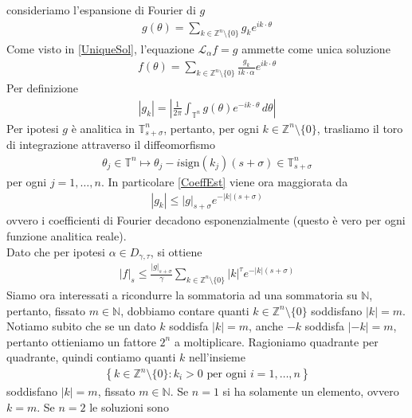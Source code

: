 \documentclass[twoside, 11pt]{amsbook}
\makeatletter
\newcommand{\0}{{(0)}}
\newcommand{\3}{{(3)}}
\theoremstyle{colonplain}
\theoremstyle{colondefinition}
\theoremstyle{colonremark}
\numberwithin{equation}{chapter}
\renewcommand{\proofname}{Dimostrazione}
\renewenvironment{proof}[1][\proofname]{\par
  \pushQED{\qed}%
  \normalfont \topsep6\p@\@plus6\p@\relax
  \trivlist
  \item[\hskip\labelsep\bfseries #1:]\ignorespaces
}{%
  \popQED\endtrivlist\@endpefalse
}
\makeatother
\begin{document}
\begin{proof} consideriamo l'espansione di Fourier di $g$
\begin{align}
    g(\theta) = \sum_{k \in \mathbb{Z}^n\setminus\{0\}} g_k e^{ik \cdot \theta}
\end{align}
Come visto in \eqref{UniqueSol}, l'equazione $\mathcal{L}_\alpha f = g$ ammette come unica soluzione
\begin{align}
    f(\theta) = \sum_{k \in \mathbb{Z}^n\setminus\{0\}} \frac{g_k}{ik \cdot \alpha}e^{ik \cdot \theta}
\end{align}
Per definizione
\begin{align}\label{CoeffEst}
    |g_k| = \left|\frac{1}{2\pi}\int_{\mathbb{T}^n} g(\theta)e^{-ik \cdot \theta} \, d\theta\right|
\end{align}
Per ipotesi $g$ è analitica in $\mathbb{T}^n_{s + \sigma}$, pertanto, per ogni $k \in \mathbb{Z}^n\setminus\{0\}$, trasliamo il toro di integrazione attraverso il diffeomorfismo
\begin{align}
    \theta_j \in \mathbb{T}^n \mapsto \theta_j - i\mathrm{sign}(k_j)(s + \sigma) \in \mathbb{T}^n_{s + \sigma}
\end{align}
per ogni $j = 1, \dots, n$. In particolare \eqref{CoeffEst} viene ora maggiorata da
\begin{align}
    |g_k| \leq |g|_{s + \sigma}e^{-|k|(s + \sigma)}
\end{align}
ovvero i coefficienti di Fourier decadono esponenzialmente (questo è vero per ogni funzione analitica reale). \\
Dato che per ipotesi $\alpha \in D_{\gamma, \tau}$, si ottiene
\begin{align}\label{|f|_s Est}
    |f|_s \leq \frac{|g|_{s + \sigma}}{\gamma}\sum_{k \in \mathbb{Z}^n\setminus\{0\}} |k|^\tau e^{-|k|(s + \sigma)}
\end{align}
Siamo ora interessati a ricondurre la sommatoria ad una sommatoria su $\mathbb{N}$, pertanto, fissato $m \in \mathbb{N}$, dobbiamo contare quanti $k \in \mathbb{Z}^n\setminus\{0\}$ soddisfano $|k| = m$. Notiamo subito che se un dato $k$ soddisfa $|k| = m$, anche $-k$ soddisfa $|-k| = m$, pertanto ottieniamo un fattore $2^n$ a moltiplicare. Ragioniamo quadrante per quadrante, quindi contiamo quanti $k$ nell'insieme
\begin{align}
    \left\{k \in \mathbb{Z}^n\setminus\{0\} : k_i > 0 \text{ per ogni } i = 1, \dots, n\right\}
\end{align}
soddisfano $|k| = m$, fissato $m \in \mathbb{N}$. Se $n = 1$ si ha solamente un elemento, ovvero $k = m$. Se $n = 2$ le soluzioni sono

\end{proof}
\end{document}
